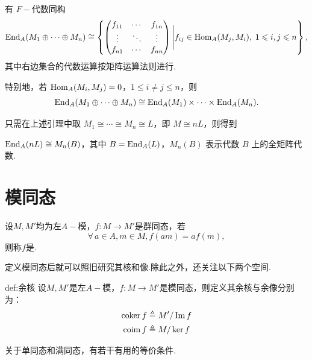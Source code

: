\begin{lemma}
    有 $F-\!\!$代数同构
    \[
    \operatorname{End}_A(M_1\oplus\cdots\oplus M_n) \cong \left\{ \begin{pmatrix} f_{11} & \cdots & f_{1n} \\ \vdots & \ddots & \vdots \\ f_{n1} & \cdots & f_{nn} \end{pmatrix} \Bigg| f_{ij}\in\operatorname{Hom}_A(M_j, M_i),\; 1\leqslant i, j\leqslant n \right\},
    \]
    其中右边集合的代数运算按矩阵运算法则进行.\par
    特别地，若 $\operatorname{Hom}_A(M_i, M_j)=0$，$1\le i\ne j\le n$，则
\[
\operatorname{End}_A(M_1\oplus\cdots\oplus M_n) \cong \operatorname{End}_A(M_1)\times\cdots\times\operatorname{End}_A(M_n).
\]
\end{lemma}

只需在上述引理中取 $M_1\cong\cdots\cong M_n\cong L$，即 $M\cong nL$，则得到

\begin{corollary}
    $\operatorname{End}_A(nL)\cong M_n(B)$，其中 $B=\operatorname{End}_A(L)$，$M_n(B)$ 表示代数 $B$ 上的全矩阵代数.
\end{corollary}



\section{模同态}

\begin{definition}[模同态]
    设$M, M'$均为左$A-\!\!$模，$f: M \to M'$是群同态，若\begin{equation}
    \forall\, a \in A, m \in M, f(am) = a f(m),
    \end{equation}
    则称$f$是.
\end{definition}

定义模同态后就可以照旧研究其核和像.除此之外，还关注以下两个空间.

\begin{definition}[余核，余像]{def:余核}
    设$M, M'$是左$A-\!\!$模，$f: M \to M'$是模同态，则定义其余核与余像分别为：
    \begin{align*}
        \operatorname{coker} f &\triangleq M' / \operatorname{Im} f \\
        \operatorname{coim} f &\triangleq M / \ker f
    \end{align*}
\end{definition}

关于单同态和满同态，有若干有用的等价条件.

